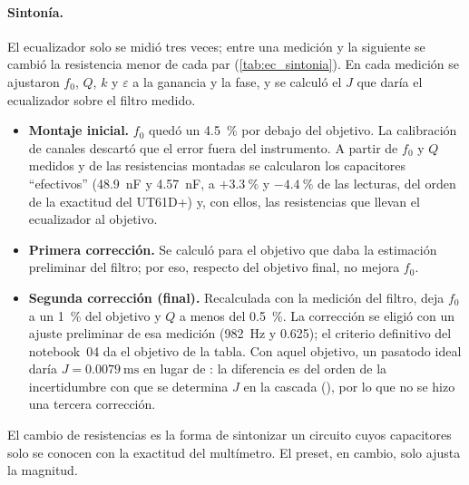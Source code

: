 \paragraph{Sintonía.} El ecualizador solo se midió tres veces; entre una medición y la siguiente se cambió la resistencia menor de cada par
(\cref{tab:ec_sintonia}). En cada medición se ajustaron $f_0$, $Q$, $k$ y $\varepsilon$ a la ganancia y la fase, y se calculó el $J$ que daría
el ecualizador sobre el filtro medido.
\begin{itemize}
  \item \textbf{Montaje inicial.} $f_0$ quedó un \qty{4.5}{\percent} por debajo del objetivo. La calibración de canales descartó que el error fuera
        del instrumento. A partir de $f_0$ y $Q$ medidos y de las resistencias montadas se calcularon los capacitores ``efectivos''
        (\qty{48.9}{\nano\farad} y \qty{4.57}{\nano\farad}, a $+\qty{3.3}{\percent}$ y $-\qty{4.4}{\percent}$ de las lecturas, del orden de la
        exactitud del UT61D+) y, con ellos, las resistencias que llevan el
        ecualizador al objetivo.
  \item \textbf{Primera corrección.} Se calculó para el objetivo que daba la estimación preliminar del filtro; por eso, respecto del objetivo final,
        no mejora $f_0$.
  \item \textbf{Segunda corrección (final).} Recalculada con la medición del filtro, deja $f_0$ a un \qty{1}{\percent} del objetivo y $Q$ a menos
        del \qty{0.5}{\percent}. La corrección se eligió con un ajuste preliminar de esa medición (\qty{982}{\hertz} y \num{0.625}); el criterio
        definitivo del notebook~04 da el objetivo de la tabla. Con aquel objetivo, un pasatodo ideal daría $J = \qty{0.0079}{\milli\second}$ en lugar
        de : la diferencia es del orden de la incertidumbre con que se determina $J$ en la cascada
        (), por lo que no se hizo una tercera corrección.
\end{itemize}
El cambio de resistencias es la forma de sintonizar un circuito cuyos capacitores solo se conocen con la exactitud del multímetro. El preset, en
cambio, solo ajusta la magnitud.

\begin{table}[H]
  \centering\small
  \caption{Sintonía del ecualizador solo: resistencias medidas, $f_0$ y $Q$ ajustados a cada medición, y $J$ previsto sobre el filtro medido. La
  mejora es el cociente entre $J$ del filtro solo () y $J$ con el ecualizador.}
  \label{tab:ec_sintonia}
\end{table}

